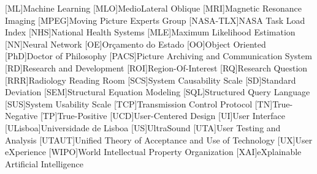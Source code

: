\begin{acronym}[H.264/SVC]
[ML]{Machine Learning}
[MLO]{MedioLateral Oblique}
[MRI]{Magnetic Resonance Imaging}
[MPEG]{Moving Picture Experts Group}
[NASA-TLX]{NASA Task Load Index}
[NHS]{National Health Systems}
[MLE]{Maximum Likelihood Estimation}
[NN]{Neural Network}
[OE]{Or\c{c}amento do Estado}
[OO]{Object Oriented}
[PhD]{Doctor of Philosophy}
[PACS]{Picture Archiving and Communication System}
[RD]{Research and Development}
[ROI]{Region-Of-Interest}
[RQ]{Research Question}
[RRR]{Radiology Reading Room}
[SCS]{System Causability Scale}
[SD]{Standard Deviation}
[SEM]{Structural Equation Modeling}
[SQL]{Structured Query Language}
[SUS]{System Usability Scale}
[TCP]{Transmission Control Protocol}
[TN]{True-Negative}
[TP]{True-Positive}
[UCD]{User-Centered Design}
[UI]{User Interface}
[ULisboa]{Universidade de Lisboa}
[US]{UltraSound}
[UTA]{User Testing and Analysis}
[UTAUT]{Unified Theory of Acceptance and Use of Technology}
[UX]{User eXperience}
[WIPO]{World Intellectual Property Organization}
[XAI]{eXplainable Artificial Intelligence}
\end{acronym}